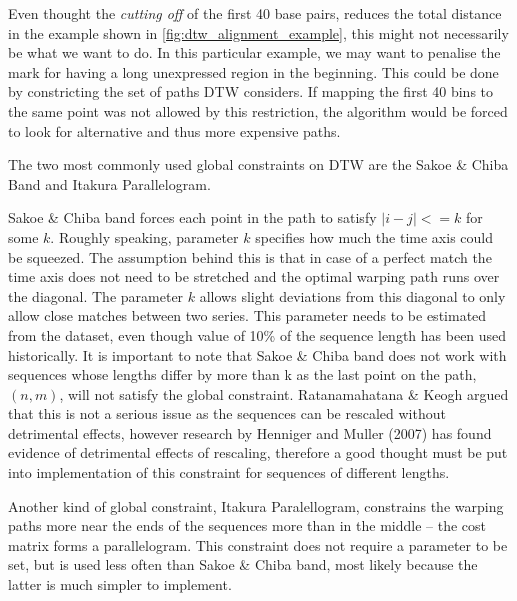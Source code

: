 \documentclass[12pt,a4paper]{article}
\begin{document}
Even thought the \emph{cutting off} of the first 40 base pairs, reduces the
total distance in the example shown in \ref{fig:dtw_alignment_example}, this
might not necessarily be what we want to do. In this particular example, we
may want to penalise the mark for having a long unexpressed region in the
beginning.  This could be done by constricting the set of paths DTW considers.
If mapping the first 40 bins to the same point was not allowed by this
restriction, the algorithm would be forced to look for alternative and thus more
expensive paths.  

The two most commonly used global constraints on DTW are the Sakoe \& Chiba
Band\cite{Sakoe:1978ta} and Itakura Parallelogram\cite{Itakura:1975jh}. 

Sakoe \& Chiba band forces each point in the path to satisfy $|i-j| <= k$ for
some $k$. Roughly speaking, parameter $k$ specifies how much the time axis
could be squeezed. The assumption behind this is that in case of a perfect match 
the time axis does not need to be stretched and the optimal warping path runs over the diagonal.
The parameter $k$ allows slight deviations from this diagonal to only allow close matches between two series.
This parameter needs to be estimated from the dataset,
even though value of 10\% of the sequence length has been used
historically\cite{Ratanamahatana:2004wu}. It is important to note that Sakoe \&
Chiba band does not work with sequences whose lengths differ by more than k as the last point on the path, $(n,m)$, will not satisfy the global constraint. 
Ratanamahatana \& Keogh argued that this is not a serious issue as
the sequences can be rescaled without detrimental effects, however research by
Henniger and Muller (2007)\cite{Henniger:2007us} has found evidence of
detrimental effects of rescaling, therefore a good thought must be put into implementation
of this constraint for sequences of different lengths.

Another kind of global constraint, Itakura Paralellogram, constrains the
warping paths more near the ends of the sequences more than in the middle --
the cost matrix forms a parallelogram. This constraint does not require a parameter to be set, but is used less often than Sakoe \& Chiba band, most likely because the latter is much simpler to implement.
\end{document}
